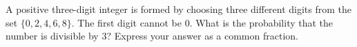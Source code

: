 A positive three-digit integer is formed by choosing three different digits from the set $\{0,2,4,6,8\}$. The first digit cannot be $0$. What is the probability that the number is divisible by $3$? Express your answer as a common fraction.
